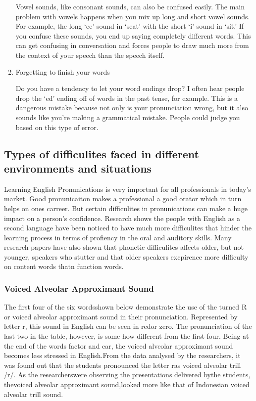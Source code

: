 \begin{enumerate}
Vowel sounds, like consonant sounds, can also be confused easily. The main problem with vowels happens when you mix up long and short vowel sounds. For example, the long ‘ee’ sound in ‘seat’ with the short ‘i’ sound in ‘sit.’ If you confuse these sounds, you end up saying completely different words. This can get confusing in conversation and forces people to draw much more from the context of your speech than the speech itself.

	\item Forgetting to finish your words

Do you have a tendency to let your word endings drop? I often hear people drop the ‘ed’ ending off of words in the past tense, for example. This is a dangerous mistake because not only is your pronunciation wrong, but it also sounds like you’re making a grammatical mistake. People could judge you based on this type of error.

\end{enumerate}

\subsection{Types of difficulites faced in different environments and
situations}

Learning English Pronunications is very important for all professionals
in today's market. Good pronunicaiton makes a professional a good orator
which in turn helps on ones carreer. But certain difficulites in
pronunications can make a huge impact on a person's confidence. Research
shows the people with English as a second language have been noticed to
have much more difficulites that hinder the learning process in terms of
profiency in the oral and auditory skills. Many research papers have
also shown that phonetic difficulites affects older, but not younger,
speakers who stutter and that older speakers excpirence more difficulty
on content words thatn function words.

\subsubsection{Voiced Alveolar Approximant Sound}

The first four of the six wordsshown below demonstrate the use of the
turned R or voiced alveolar approximant sound in their pronunciation.
Represented by letter r, this sound in English can be seen in redor
zero. The pronunciation of the last two in the table, however, is some
how different from the first four. Being at the end of the words factor
and car, the voiced alveolar approximant sound becomes less stressed in
English.From the data analysed by the researchers, it was found out that
the students pronounced the letter ras voiced alveolar trill /r/. As the
researcherswere observing the presentations delivered bythe students,
thevoiced alveolar approximant sound,looked more like that of Indonesian
voiced alveolar trill sound.

